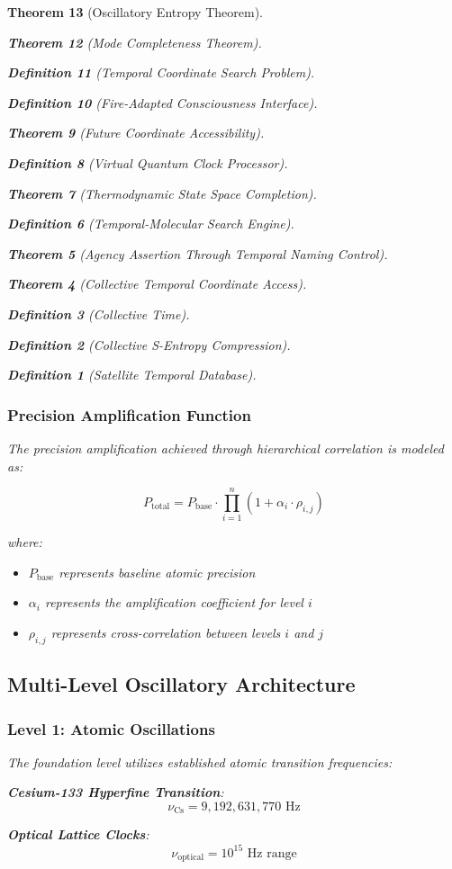 \documentclass[12pt,a4paper]{article}
\newtheorem{theorem}{Theorem}[section]
\newtheorem{definition}[theorem]{Definition}
\begin{document}
\begin{theorem}[Oscillatory Entropy Theorem]
\begin{theorem}[Mode Completeness Theorem]
\begin{enumerate}
\begin{definition}[Temporal Coordinate Search Problem]
\begin{algorithm}
\begin{definition}[Fire-Adapted Consciousness Interface]
\begin{theorem}[Future Coordinate Accessibility]
\begin{definition}[Virtual Quantum Clock Processor]
\begin{itemize}
\begin{itemize}
\begin{theorem}[Thermodynamic State Space Completion]
\begin{definition}[Temporal-Molecular Search Engine]
\begin{theorem}[Agency Assertion Through Temporal Naming Control]
\begin{remark}
\begin{theorem}[Collective Temporal Coordinate Access]
\begin{definition}[Collective Time]
\begin{definition}[Collective S-Entropy Compression]
\begin{definition}[Satellite Temporal Database]
\begin{algorithm}
\begin{table}[h]
{{\subsubsection{Precision Amplification Function}

The precision amplification achieved through hierarchical correlation is modeled as:

\begin{equation}
P_{\text{total}} = P_{\text{base}} \cdot \prod_{i=1}^{n} (1 + \alpha_i \cdot \rho_{i,j})
\end{equation}

where:
\begin{itemize}
\item $P_{\text{base}}$ represents baseline atomic precision
\item $\alpha_i$ represents the amplification coefficient for level $i$
\item $\rho_{i,j}$ represents cross-correlation between levels $i$ and $j$
\end{itemize}

\subsection{Multi-Level Oscillatory Architecture}

\subsubsection{Level 1: Atomic Oscillations}

The foundation level utilizes established atomic transition frequencies:

\textbf{Cesium-133 Hyperfine Transition}:
\begin{equation}
\nu_{\text{Cs}} = 9,192,631,770 \text{ Hz}
\end{equation}

\textbf{Optical Lattice Clocks}:
\begin{equation}
\nu_{\text{optical}} = 10^{15} \text{ Hz range}
\end{equation}

}}
\end{table}
\end{algorithm}
\end{definition}
\end{definition}
\end{definition}
\end{theorem}
\end{remark}
\end{theorem}
\end{definition}
\end{theorem}
\end{itemize}
\end{itemize}
\end{definition}
\end{theorem}
\end{definition}
\end{algorithm}
\end{definition}
\end{enumerate}
\end{theorem}
\end{theorem}
\end{document}

